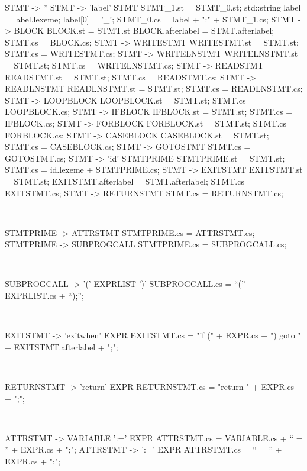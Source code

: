 \begin{verbbox}[\scriptsize]
STMT -> '' {}
STMT -> 'label' STMT
{
STMT_1.st = STMT_0.st;
std::string label = label.lexeme; 
label[0] = '_'; 
STMT_0.cs = label + ":\n" + STMT_1.cs;
}
STMT -> BLOCK
{
BLOCK.st = STMT.st
BLOCK.afterlabel = STMT.afterlabel;
STMT.cs = BLOCK.cs;
}
STMT -> WRITESTMT
{
WRITESTMT.st = STMT.st;
STMT.cs  = WRITESTMT.cs;
}
STMT -> WRITELNSTMT
{
WRITELNSTMT.st = STMT.st;
STMT.cs = WRITELNSTMT.cs;
}
STMT -> READSTMT
{
READSTMT.st = STMT.st;
STMT.cs = READSTMT.cs;
}
STMT -> READLNSTMT
{
READLNSTMT.st = STMT.st;
STMT.cs = READLNSTMT.cs;
}
STMT -> LOOPBLOCK
{
LOOPBLOCK.st = STMT.st;
STMT.cs = LOOPBLOCK.cs;
}
STMT -> IFBLOCK
{
IFBLOCK.st = STMT.st;
STMT.cs = IFBLOCK.cs;
}
STMT -> FORBLOCK
{
FORBLOCK.st = STMT.st;
STMT.cs = FORBLOCK.cs;
}
STMT -> CASEBLOCK
{
CASEBLOCK.st = STMT.st;
STMT.cs = CASEBLOCK.cs;
}
STMT -> GOTOSTMT
{
STMT.cs = GOTOSTMT.cs;
}
STMT -> 'id' STMTPRIME
{
STMTPRIME.st = STMT.st;
STMT.cs = id.lexeme + STMTPRIME.cs;
}
STMT -> EXITSTMT
{
EXITSTMT.st = STMT.st;
EXITSTMT.afterlabel = STMT.afterlabel;
STMT.cs = EXITSTMT.cs;
}
STMT -> RETURNSTMT
{
STMT.cs = RETURNSTMT.cs;
}
\end{verbbox}
\theverbbox\\

\begin{verbbox}[\scriptsize]
STMTPRIME -> ATTRSTMT
{
STMTPRIME.cs = ATTRSTMT.cs;
}
STMTPRIME -> SUBPROGCALL
{
STMTPRIME.cs = SUBPROGCALL.cs;
}
\end{verbbox} 
\theverbbox\\

\begin{verbbox}[\scriptsize]
SUBPROGCALL -> '(' EXPRLIST ')'
{
SUBPROGCALL.cs = “(” + EXPRLIST.cs + “);\n”;
}
\end{verbbox} 
\theverbbox\\

\begin{verbbox}[\scriptsize]
EXITSTMT -> 'exitwhen' EXPR
{
EXITSTMT.cs = "if (" + EXPR.cs + ") goto " + EXITSTMT.afterlabel + ";\n";
}
\end{verbbox} 
\theverbbox\\

\begin{verbbox}[\scriptsize]
RETURNSTMT -> 'return' EXPR
{
RETURNSTMT.cs = "return " + EXPR.cs + ";\n";
}
\end{verbbox} 
\theverbbox\\

\begin{verbbox}[\scriptsize]
ATTRSTMT -> VARIABLE ':=' EXPR
{
ATTRSTMT.cs = VARIABLE.cs + “ = ” + EXPR.cs + ";\n";
}
ATTRSTMT -> ':=' EXPR
{
ATTRSTMT.cs = “ = ” + EXPR.cs + ";\n";
}
\end{verbbox} 
\theverbbox\\

